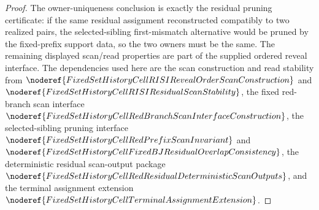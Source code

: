 \begin{proof}
The owner-uniqueness conclusion is exactly the residual pruning certificate:
if the same residual assignment reconstructed compatibly to two realized
pairs, the selected-sibling first-mismatch alternative would be pruned by
the fixed-prefix support data, so the two owners must be the same.  The
remaining displayed scan/read properties are part of the supplied ordered
reveal interface.  The dependencies used here are the scan construction and
read stability from
\(\noderef{FixedSetHistoryCellRISIRevealOrderScanConstruction}\) and
\(\noderef{FixedSetHistoryCellRISIResidualScanStability}\), the fixed
red-branch scan interface
\(\noderef{FixedSetHistoryCellRedBranchScanInterfaceConstruction}\), the
selected-sibling pruning interface
\(\noderef{FixedSetHistoryCellRedPrefixScanInvariant}\) and
\(\noderef{FixedSetHistoryCellFixedBJResidualOverlapConsistency}\), the
deterministic residual scan-output package
\(\noderef{FixedSetHistoryCellRedResidualDeterministicScanOutputs}\), and
the terminal assignment extension
\(\noderef{FixedSetHistoryCellTerminalAssignmentExtension}\).
\end{proof}
